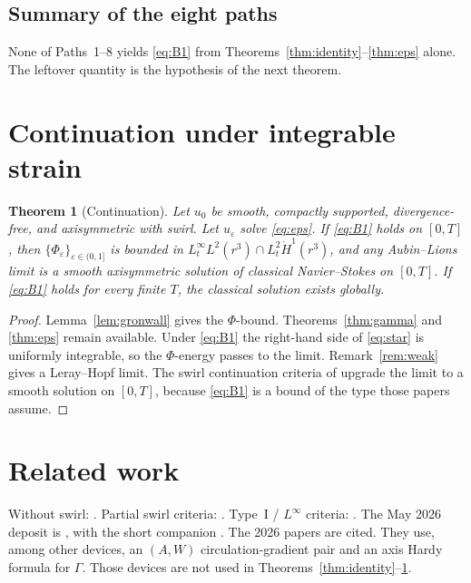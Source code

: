 \documentclass[11pt]{article}
\newtheorem{theorem}{Theorem}[section]
\theoremstyle{definition}
\newcommand{\eps}{\varepsilon}
\newcommand{\Ph}{\Phi}
\newcommand{\Ga}{\Gamma}
\newcommand{\Lint}{L^{\infty}}
\begin{document}
\subsection{Summary of the eight paths}

None of Paths~1--8 yields \eqref{eq:B1} from
Theorems~\ref{thm:identity}--\ref{thm:eps} alone.
The leftover quantity is the hypothesis of the next theorem.

\section{Continuation under integrable strain}

\begin{theorem}[Continuation]
\label{thm:cond}
Let \(u_0\) be smooth, compactly supported, divergence-free, and
axisymmetric with swirl. Let \(u_\eps\) solve \eqref{eq:eps}.
If \eqref{eq:B1} holds on \([0,T]\), then
\(\{\Ph_\eps\}_{\eps\in(0,1]}\) is bounded in
\(L^\infty_t L^2(r^3)\cap L^2_t\dot H^1(r^3)\),
and any Aubin--Lions limit is a smooth axisymmetric solution of
classical Navier--Stokes on \([0,T]\).
If \eqref{eq:B1} holds for every finite \(T\), the classical solution
exists globally.
\end{theorem}

\begin{proof}
Lemma~\ref{lem:gronwall} gives the \(\Ph\)-bound.
Theorems~\ref{thm:gamma} and \ref{thm:eps} remain available.
Under \eqref{eq:B1} the right-hand side of \eqref{eq:star} is uniformly
integrable, so the \(\Ph\)-energy passes to the limit.
Remark~\ref{rem:weak} gives a Leray--Hopf limit.
The swirl continuation criteria of
\cite{CSTY2008,CSTY2009}
upgrade the limit to a smooth solution on \([0,T]\), because
\eqref{eq:B1} is a bound of the type those papers assume.
\end{proof}

\section{Related work}

Without swirl: \cite{Lady1968,UY1968}.
Partial swirl criteria: \cite{ChaeLee2002,HouLi2008,Danchin2007,ChenFangZhang2017}.
Type~I / \(\Lint\) criteria:
\cite{CSTY2008,CSTY2009,LeiZhang2011,Seregin2012}.
The May 2026 deposit is \cite{SimonsPhi2026}, with the short companion
\cite{SimonsPhiShort2026}.
The 2026 papers \cite{ShahApr,ShahMay,ShahJun} are cited.
They use, among other devices, an \((A,W)\) circulation-gradient pair
and an axis Hardy formula for \(\Ga\). Those devices are not used in
Theorems~\ref{thm:identity}--\ref{thm:cond}.
\end{document}
